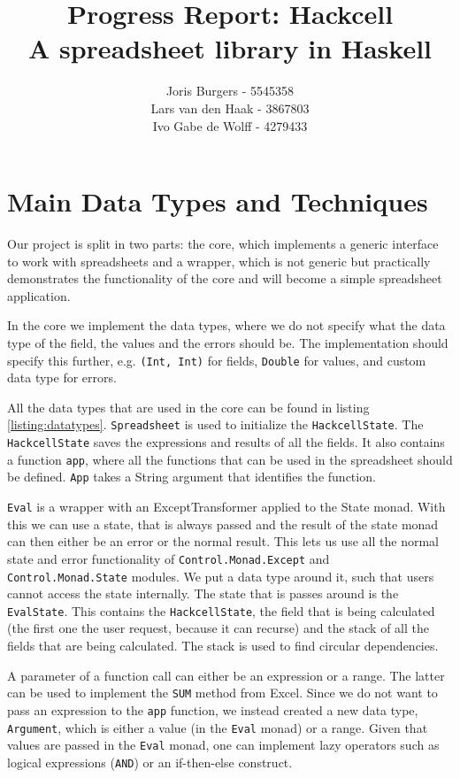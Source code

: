 \documentclass{article}
\title{
	Progress Report: Hackcell \\
	\vskip 0.5cm
	\large{A spreadsheet library in Haskell}
}
\author{Joris Burgers - 5545358\\ Lars van den Haak - 3867803\\ Ivo Gabe de Wolff - 4279433}
\begin{document}
	\maketitle
	\section{Main Data Types and Techniques}
	Our project is split in two parts: the core, which implements a generic interface to work with spreadsheets and a wrapper, which is not generic but practically demonstrates the functionality of the core and will become a simple spreadsheet application.
	
	In the core we implement the data types, where we do not specify what the data type of the field, the values and the errors should be. The implementation should specify this further, e.g. \texttt{(Int, Int)} for fields, \texttt{Double} for values, and custom data type for errors.
	
	All the data types that are used in the core can be found in listing \ref{listing:datatypes}. \texttt{Spreadsheet} is used to initialize the \texttt{HackcellState}. The \texttt{HackcellState} saves the expressions and results of all the fields. It also contains a function \texttt{app}, where all the functions that can be used in the spreadsheet should be defined. \texttt{App} takes a String argument that identifies the function.
	
	\texttt{Eval} is a wrapper with an ExceptTransformer applied to the State monad. With this we can use a state, that is always passed and the result of the state monad can then either be an error or the normal result. This lets us use all the normal state and error functionality of \texttt{Control.Monad.Except} and \texttt{Control.Monad.State} modules. We put a data type around it, such that users cannot access the state internally. The state that is passes around is the \texttt{EvalState}. This contains the \texttt{HackcellState}, the field that is being calculated (the first one the user request, because it can recurse) and the stack of all the fields that are being calculated. The stack is used to find circular dependencies.
	
	A parameter of a function call can either be an expression or a range. The latter can be used to implement the \texttt{SUM} method from Excel. Since we do not want to pass an expression to the \texttt{app} function, we instead created a new data type, \texttt{Argument}, which is either a value (in the \texttt{Eval} monad) or a range. Given that values are passed in the \texttt{Eval} monad, one can implement lazy operators such as logical expressions (\texttt{AND}) or an if-then-else construct.
	
\end{document}
